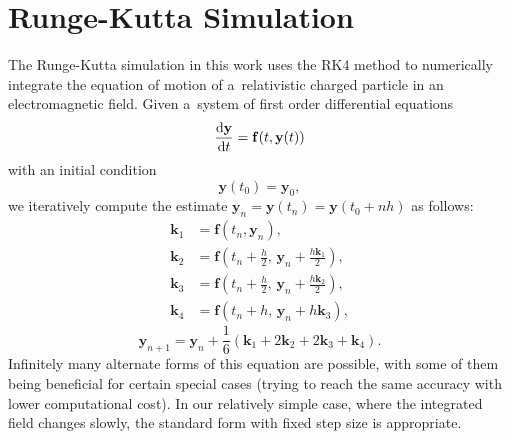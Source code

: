 	\section{Runge-Kutta Simulation}
	\label{sec:rks}
		The Runge-Kutta simulation in this work uses the \ac{RK4} method to numerically integrate the equation of motion of a~relativistic charged particle in an electromagnetic field. Given a~system of first order differential equations
			\begin{equation}
				\derivative{\mathbf{y}}{t}(t) = \mathbf{f}(t,\mathbf{y}(t))
			\end{equation}
		with an initial condition
			\begin{equation}
				\mathbf{y}(t_0) = \mathbf{y}_0,
			\end{equation}
		we iteratively compute the estimate $\mathbf{y}_n = \mathbf{y}(t_n) = \mathbf{y}(t_0+nh)$ as follows:
			\begin{align}
				\mathbf{k}_1 &= \mathbf{f}(t_n,\mathbf{y}_n),\\
				\mathbf{k}_2 &= \mathbf{f}\left(t_n+\frac{h}{2},\, \mathbf{y}_n+\frac{h\mathbf{k}_1}{2}\right),\\
				\mathbf{k}_3 &= \mathbf{f}\left(t_n+\frac{h}{2},\, \mathbf{y}_n+\frac{h\mathbf{k}_2}{2}\right),\\
				\mathbf{k}_4 &= \mathbf{f}(t_n+h,\, \mathbf{y}_n+h\mathbf{k}_3),
			\end{align}
			\begin{equation}
				\mathbf{y}_{n+1} = \mathbf{y}_n + \frac{1}{6}(\mathbf{k}_1+2\mathbf{k}_2+2\mathbf{k}_3+\mathbf{k}_4).
			\end{equation}
		Infinitely many alternate forms of this equation are possible, with some of them being beneficial for certain special cases (trying to reach the same accuracy with lower computational cost). In our relatively simple case, where the integrated field changes slowly, the standard form with fixed step size is appropriate.
		
